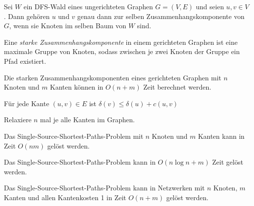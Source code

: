 \documentclass{cheat-sheet}
\begin{document}
\begin{satz}
  Sei $W$ ein DFS-Wald eines ungerichteten Graphen $G = (V, E)$ und seien $u, v \in V$. Dann gehören $u$ und $v$ genau dann zur selben Zusammenhangskomponente von $G$, wenn sie Knoten im selben Baum von $W$ sind.
\end{satz}

\begin{defn}
  Eine \emph{starke Zusammenhangskomponente} in einem gerichteten Graphen ist eine maximale Gruppe von Knoten, sodass zwischen je zwei Knoten der Gruppe ein Pfad existiert.
\end{defn}

\begin{satz}
  Die starken Zusammenhangskomponenten eines gerichteten Graphen mit $n$ Knoten und $m$ Kanten können in $O(n+m)$ Zeit berechnet werden.
\end{satz}




\begin{lem}
  Für jede Kante $(u, v) \in E$ ist $\delta(v) \leq \delta(u) + c(u, v)$
\end{lem}

\begin{alg}
  Relaxiere $n$ mal je alle Kanten im Graphen.
\end{alg}

\begin{satz}
  Das Single-Source-Shortest-Paths-Problem mit $n$ Knoten und $m$ Kanten kann in Zeit $O(nm)$ gelöst werden.
\end{satz}

\begin{satz}
  Das Single-Source-Shortest-Paths-Problem kann in $O(n \log n + m)$ Zeit gelöst werden.
\end{satz}

\begin{satz}
  Das Single-Source-Shortest-Paths-Problem kann in Netzwerken mit $n$ Knoten, $m$ Kanten und allen Kantenkosten 1 in Zeit $O(n+m)$ gelöst werden.
\end{satz}

\end{document}
